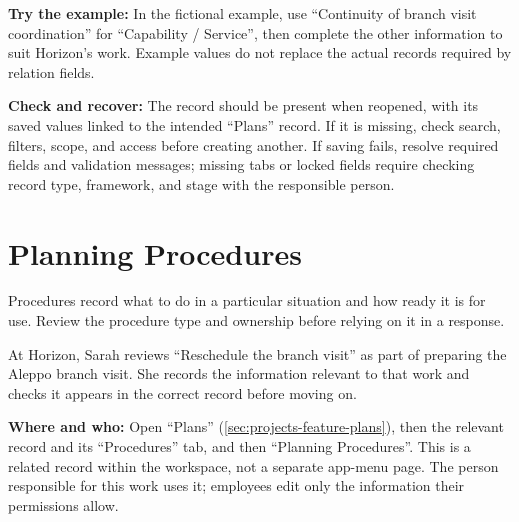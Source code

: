 \textbf{Try the example:} In the fictional example, use “Continuity of branch visit coordination” for “Capability / Service”, then complete the other information to suit Horizon's work. Example values do not replace the actual records required by relation fields.

\textbf{Check and recover:} The record should be present when reopened, with its saved values linked to the intended “Plans” record. If it is missing, check search, filters, scope, and access before creating another. If saving fails, resolve required fields and validation messages; missing tabs or locked fields require checking record type, framework, and stage with the responsible person.

\clearpage
\section{Planning Procedures}
\label{sec:projects-feature-planning-procedures}

Procedures record what to do in a particular situation and how ready it is for use. Review the procedure type and ownership before relying on it in a response.

\begin{rcnote}
At Horizon, Sarah reviews “Reschedule the branch visit” as part of preparing the Aleppo branch visit. She records the information relevant to that work and checks it appears in the correct record before moving on.
\end{rcnote}

\textbf{Where and who:} Open “Plans” (\ref{sec:projects-feature-plans}), then the relevant record and its “Procedures” tab, and then “Planning Procedures”. This is a related record within the workspace, not a separate app-menu page. The person responsible for this work uses it; employees edit only the information their permissions allow.

